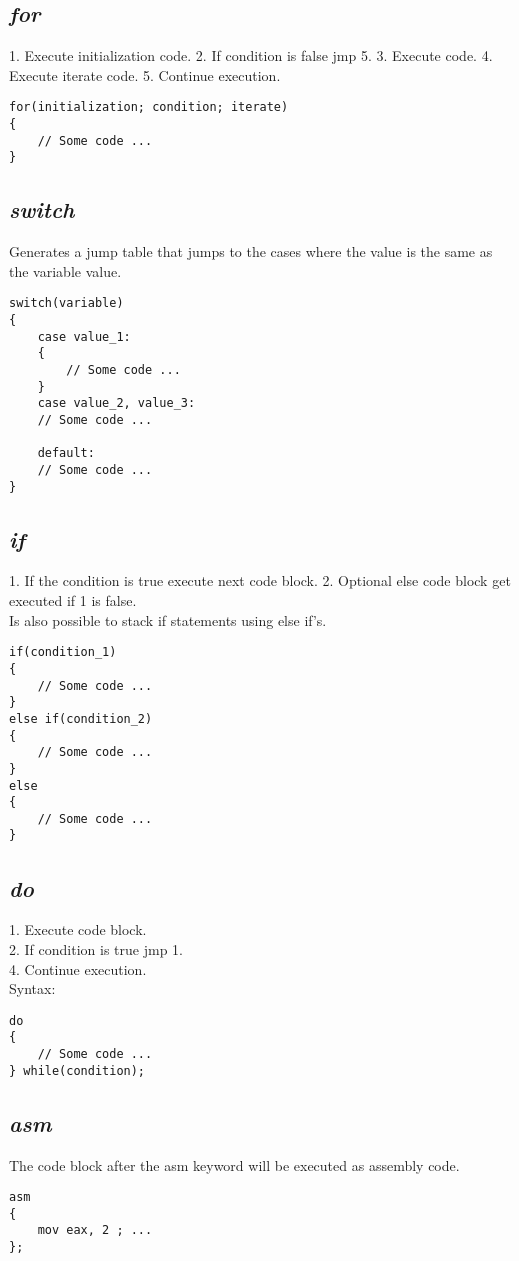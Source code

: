 \documentclass[11pt,a4paper]{article}
\begin{document}
\subsection{\textit{for}}
1. Execute initialization code.
2. If condition is false jmp 5.
3. Execute code.
4. Execute iterate code.
5. Continue execution.
\begin{lstlisting}
for(initialization; condition; iterate)
{
	// Some code ...
}
\end{lstlisting}


\subsection{\textit{switch}}
Generates a jump table that jumps to the cases where the value is the same as the variable value.
\begin{lstlisting}
switch(variable)
{
	case value_1:
	{
		// Some code ...
	}
	case value_2, value_3:
	// Some code ...

	default:
	// Some code ...
}
\end{lstlisting}


\subsection{\textit{if}}
1. If the condition is true execute next code block.
2. Optional else code block get executed if 1 is false. \\
Is also possible to stack if statements using else if's.
\begin{lstlisting}
if(condition_1)
{
	// Some code ...
}
else if(condition_2)
{
	// Some code ...
}
else
{
	// Some code ...
}
\end{lstlisting}


\subsection{\textit{do}}
1. Execute code block. \\
2. If condition is true jmp 1. \\
4. Continue execution. \\
Syntax:
\begin{lstlisting}
do
{
	// Some code ...
} while(condition);
\end{lstlisting}


\subsection{\textit{asm}}
The code block after the asm keyword will be executed as assembly code.
\begin{lstlisting}
asm
{
	mov eax, 2 ; ...
};
\end{lstlisting}
\end{document}
